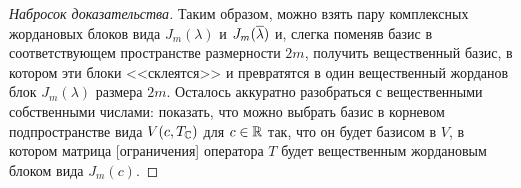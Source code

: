 \begin{proof}[Набросок доказательства]
Таким образом, можно взять пару комплексных жордановых блоков
вида $J_m(\lambda)$ и $J_m(\overline\lambda)$ и, слегка поменяв базис
в соответствующем пространстве размерности $2m$, получить
вещественный базис, в котором эти блоки <<склеятся>> и превратятся
в один вещественный жорданов блок $J_m(\lambda)$ размера $2m$.
Осталось аккуратно разобраться с вещественными собственными числами:
показать, что можно выбрать базис в корневом подпространстве
вида $V(c,T_\mathbb C)$ для $c\in\mathbb R$ так, что он будет базисом в $V$, в котором
матрица [ограничения] оператора $T$ будет вещественным жордановым
блоком вида $J_m(c)$.
\end{proof}
